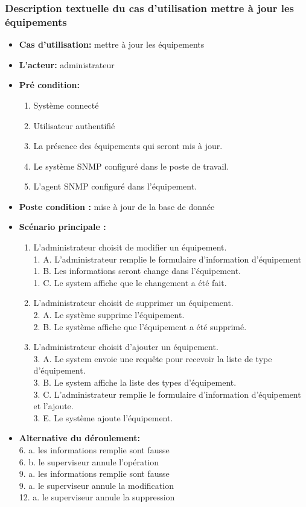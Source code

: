 \subsubsection{ Description textuelle du cas d'utilisation  mettre à jour les équipements}
\begin{itemize}
\item \textbf{Cas d'utilisation: } mettre à jour  les équipements
\item \textbf{L'acteur: } administrateur
\item \textbf{Pré condition: }
\begin{enumerate}
\item Système connecté
\item Utilisateur authentifié
\item La présence des équipements qui seront mis à jour.
\item Le système SNMP configuré dans le poste de travail.
\item L'agent SNMP configuré dans l'équipement.
\end{enumerate}
\item \textbf{Poste condition :} mise à jour de la base de donnée
\item \textbf{Scénario principale :}

\begin{enumerate}
\item 	L'administrateur choisit de modifier  un équipement.\\
1. A. L'administrateur  remplie le formulaire d'information d'équipement \\
1. B. Les informations seront change dans l'équipement.\\
1. C. Le system affiche que le changement a été fait.\\
\item 	L'administrateur choisit de supprimer un équipement.\\
2. A. Le système supprime l'équipement. \\
2. B. Le système affiche que l'équipement a été supprimé.\\
\item 	L'administrateur choisit d'ajouter un équipement.\\
3. A. Le system  envoie une requête pour recevoir la liste de type d'équipement.\\
3. B. Le system affiche la liste des types d'équipement.\\
3. C. L'administrateur remplie le formulaire d'information d'équipement et l'ajoute.\\
3. E. Le système ajoute l'équipement.
\end{enumerate}
\item \textbf{Alternative du déroulement:\\}
6. a. les informations remplie sont fausse\\
6. b. le superviseur annule l'opération\\
9. a. les informations remplie  sont fausse\\
9. a. le superviseur annule la modification\\
12. a. le superviseur annule la suppression
\end{itemize}
 
